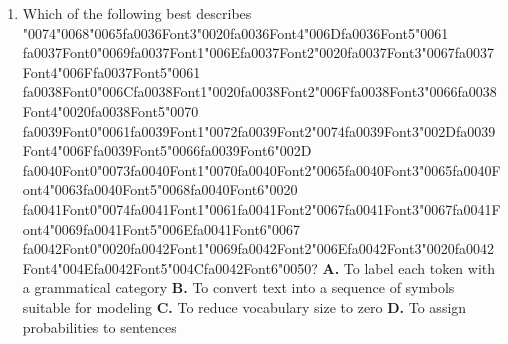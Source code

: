 \documentclass[11pt]{article}
\begin{document}
\begin{enumerate}[leftmargin=*]
  \item Which of the following best describes {\char"0074}{\char"0068}{\char"0065}{\csname fa0036Font3\endcsname\char"0020}{\csname fa0036Font4\endcsname\char"006D}{\csname fa0036Font5\endcsname\char"0061} {\csname fa0037Font0\endcsname\char"0069}{\csname fa0037Font1\endcsname\char"006E}{\csname fa0037Font2\endcsname\char"0020}{\csname fa0037Font3\endcsname\char"0067}{\csname fa0037Font4\endcsname\char"006F}{\csname fa0037Font5\endcsname\char"0061} {\csname fa0038Font0\endcsname\char"006C}{\csname fa0038Font1\endcsname\char"0020}{\csname fa0038Font2\endcsname\char"006F}{\csname fa0038Font3\endcsname\char"0066}{\csname fa0038Font4\endcsname\char"0020}{\csname fa0038Font5\endcsname\char"0070} {\csname fa0039Font0\endcsname\char"0061}{\csname fa0039Font1\endcsname\char"0072}{\csname fa0039Font2\endcsname\char"0074}{\csname fa0039Font3\endcsname\char"002D}{\csname fa0039Font4\endcsname\char"006F}{\csname fa0039Font5\endcsname\char"0066}{\csname fa0039Font6\endcsname\char"002D} {\csname fa0040Font0\endcsname\char"0073}{\csname fa0040Font1\endcsname\char"0070}{\csname fa0040Font2\endcsname\char"0065}{\csname fa0040Font3\endcsname\char"0065}{\csname fa0040Font4\endcsname\char"0063}{\csname fa0040Font5\endcsname\char"0068}{\csname fa0040Font6\endcsname\char"0020} {\csname fa0041Font0\endcsname\char"0074}{\csname fa0041Font1\endcsname\char"0061}{\csname fa0041Font2\endcsname\char"0067}{\csname fa0041Font3\endcsname\char"0067}{\csname fa0041Font4\endcsname\char"0069}{\csname fa0041Font5\endcsname\char"006E}{\csname fa0041Font6\endcsname\char"0067} {\csname fa0042Font0\endcsname\char"0020}{\csname fa0042Font1\endcsname\char"0069}{\csname fa0042Font2\endcsname\char"006E}{\csname fa0042Font3\endcsname\char"0020}{\csname fa0042Font4\endcsname\char"004E}{\csname fa0042Font5\endcsname\char"004C}{\csname fa0042Font6\endcsname\char"0050}?
    \textbf{A.} To label each token with a grammatical category
    \textbf{B.} To convert text into a sequence of symbols suitable for modeling
    \textbf{C.} To reduce vocabulary size to zero
    \textbf{D.} To assign probabilities to sentences


\end{enumerate}
\end{document}
